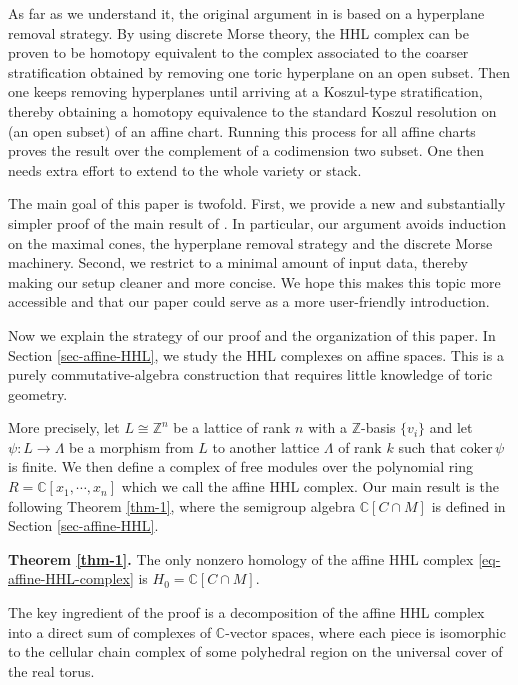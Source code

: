 \documentclass[11pt,reqno]{amsart}
\def\C {{\mathbb C}}
\def\Z {{\mathbb Z}}
\theoremstyle{definition}
\numberwithin{equation}{section}
\begin{document}
\smallskip


As far as we understand it, the original argument in \cite{HHL} is based on a hyperplane removal strategy. By using discrete Morse theory, the HHL complex can be proven to be homotopy equivalent to the complex associated to the coarser stratification obtained by removing one toric hyperplane on an open subset. Then one keeps removing hyperplanes until arriving at a Koszul-type stratification, thereby obtaining a homotopy equivalence to the standard Koszul resolution on (an open subset) of an affine chart. Running this process for all affine charts proves the result over the complement of a codimension two subset. One then needs extra effort to extend to the whole variety or stack.


\smallskip


The main goal of this paper is twofold. First, we provide a new and substantially simpler proof of the main result of \cite{HHL}. In particular, our argument avoids induction on the maximal cones, the hyperplane removal strategy and the discrete Morse machinery. Second, we restrict to a minimal amount of input data, thereby making our setup cleaner and more concise. We hope this makes this topic more accessible and that our paper could serve as a more user-friendly introduction. 

\smallskip

Now we explain the strategy of our proof and the organization of this paper. In Section \ref{sec-affine-HHL}, we study the HHL complexes on affine spaces. This is a purely commutative-algebra construction that requires little knowledge of toric geometry. 

\smallskip
More precisely, let  $L\cong \Z^n$ be a lattice of rank $n$ with a $\Z$-basis $\{v_i\}$ and let $\psi:L\rightarrow\Lambda$ 
 be a morphism from $L$ to another lattice $\Lambda$ of rank $k$ such that $\mathrm{coker}\,\psi$ is finite.
We then define a complex of free modules over the polynomial ring $R= \C[x_1,\cdots,x_n]$ which we call the affine HHL complex. Our main result is the following Theorem \ref{thm-1}, where the semigroup algebra $\C[C\cap M]$ is defined in Section \ref{sec-affine-HHL}.

\smallskip
\smallskip\noindent
{\bf Theorem \ref{thm-1}.}
    The only nonzero homology of the affine HHL complex \eqref{eq-affine-HHL-complex} is $H_0=\C[C\cap M]$. 

\smallskip

The key ingredient of the proof is a decomposition of the affine HHL complex into a direct sum of complexes of $\C$-vector spaces, where each piece is isomorphic to the cellular chain complex of some polyhedral region on the universal cover of the real torus. 
\end{document}
